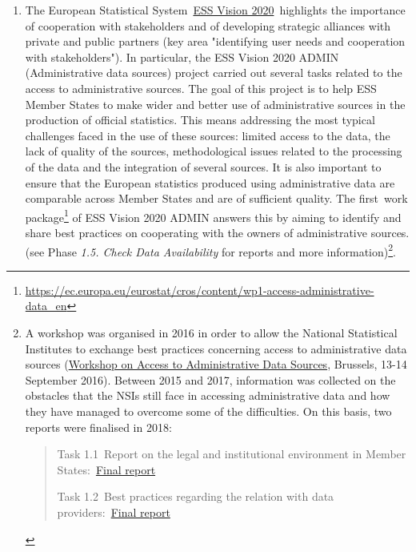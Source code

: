 \documentclass[
]{article}
\providecommand{\tightlist}{%
  \setlength{\itemsep}{0pt}\setlength{\parskip}{0pt}}
\begin{document}
\begin{enumerate}
\def\labelenumi{\arabic{enumi}.}
\setcounter{enumi}{243}
\tightlist
\item
  The European Statistical System~\href{http://ec.europa.eu/eurostat/web/ess/about-us/ess-vision-2020}{ESS Vision
  2020}~highlights
  the importance of cooperation with stakeholders and of developing
  strategic alliances with private and public partners (key area
  "identifying user needs and cooperation with stakeholders"). In
  particular, the ESS Vision 2020 ADMIN (Administrative data sources)
  project carried out several tasks related to the access to
  administrative sources. The goal of this project is to help ESS
  Member States to make wider and better use of administrative sources
  in the production of official statistics. This means addressing the
  most typical challenges faced in the use of these sources: limited
  access to the data, the lack of quality of the sources,
  methodological issues related to the processing of the data and the
  integration of several sources. It is also important to ensure that
  the European statistics produced using administrative data are
  comparable across Member States and are of sufficient quality. The
  first~work package\footnote{\url{https://ec.europa.eu/eurostat/cros/content/wp1-access-administrative-data_en}} of ESS Vision 2020 ADMIN answers this by
  aiming to identify and share best practices on cooperating with the
  owners of administrative sources. (see Phase \emph{1.5. Check Data
  Availability} for reports and more information)\footnote{A workshop was organised in 2016 in order to allow the National
    Statistical Institutes to exchange best practices concerning access
    to administrative data sources (\href{https://ec.europa.eu/eurostat/cros/content/2016-workshop-access-administrative-sources_en}{Workshop on Access to
    Administrative Data
    Sources},
    Brussels, 13-14 September 2016). Between 2015 and 2017, information
    was collected on the obstacles that the NSIs still face in accessing
    administrative data and how they have managed to overcome some of
    the difficulties. On this basis, two reports were finalised in 2018:

    \begin{quote}
    Task 1.1~Report on the legal and institutional environment in
    Member States:~\href{https://ec.europa.eu/eurostat/cros/system/files/admin-wp1.1_analysis_legal_institutional_environment_final.pdf}{Final
    report}

    Task 1.2~Best practices regarding the relation with data
    providers:~\href{https://ec.europa.eu/eurostat/cros/system/files/admin-wp1.2_good_practices_final.pdf}{Final
    report}
    \end{quote}}.
\end{enumerate}
\end{document}
